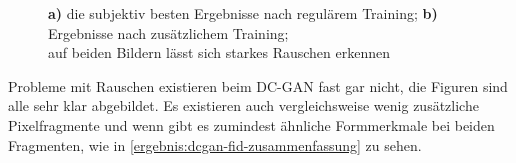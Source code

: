 \begin{figure}[H]
	\centering
	\qquad
	\label{ergebnis:densegan-zusammenfassung}
	\caption[]{\textbf{a)} die subjektiv besten Ergebnisse nach regulärem Training; \textbf{b)} Ergebnisse nach zusätzlichem Training; \\auf beiden Bildern lässt sich starkes Rauschen erkennen}
\end{figure}

Probleme mit Rauschen existieren beim DC-GAN fast gar nicht, die Figuren sind alle sehr klar abgebildet.
Es existieren auch vergleichsweise wenig zusätzliche Pixelfragmente und wenn gibt es zumindest ähnliche Formmerkmale bei beiden Fragmenten, wie in \cref{ergebnis:dcgan-fid-zusammenfassung} zu sehen.
\newline

